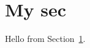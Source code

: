 \documentclass{article}
\begin{document}
\section{My sec}
\label{sec:mysec}

Hello from Section~\ref{sec:mysec}.
\end{document}
